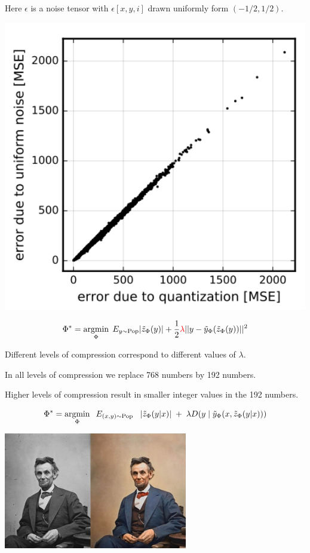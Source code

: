 {\vfill
Here $\epsilon$ is a noise tensor with $\epsilon[x,y,i]$ drawn uniformly form $(-1/2,1/2)$.


\centerline{\includegraphics[height=5in]{../images/RateDist5}}



$$\Phi^* = \operatorname*{argmin}_\Phi\; E_{y \sim \mathrm{Pop}} |\tilde{z}_\Phi(y)| + \frac{1}{2}{\color{red} \lambda} ||y - \tilde{y}_\Phi(\tilde{z}_\Phi(y))||^2$$

\vfill
Different levels of compression correspond to different values of $\lambda$.

\vfill
In all levels of compression we replace 768 numbers by 192 numbers.

\vfill
Higher levels of compression result in smaller integer values in the 192 numbers.


$$\Phi^* = \operatorname*{argmin}_\Phi \;\;E_{(x,y) \sim \mathrm{Pop}} \;\;\; |\tilde{z}_\Phi(y|x)|\; + \; \lambda D(y\;|\;\tilde{y}_\Phi(x,\tilde{z}_\Phi(y|x)))$$


\centerline{\includegraphics[height = 2in]{../images/colorization}}

}
